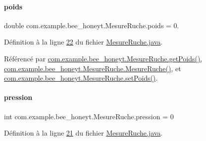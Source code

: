 \mbox{\label{classcom_1_1example_1_1bee__honeyt_1_1_mesure_ruche_a9aa6c575b7b69c4fb3825944e1f50722}} 
\paragraph{\texorpdfstring{poids}{poids}}
{\footnotesize\ttfamily double com.\+example.\+bee\+\_\+honeyt.\+Mesure\+Ruche.\+poids = 0.\hspace{0.3cm}{\ttfamily [private]}}



Définition à la ligne \hyperlink{_mesure_ruche_8java_source_l00022}{22} du fichier \hyperlink{_mesure_ruche_8java_source}{Mesure\+Ruche.\+java}.



Référencé par \hyperlink{_mesure_ruche_8java_source_l00102}{com.\+example.\+bee\+\_\+honeyt.\+Mesure\+Ruche.\+get\+Poids()}, \hyperlink{_mesure_ruche_8java_source_l00030}{com.\+example.\+bee\+\_\+honeyt.\+Mesure\+Ruche.\+Mesure\+Ruche()}, et \hyperlink{_mesure_ruche_8java_source_l00107}{com.\+example.\+bee\+\_\+honeyt.\+Mesure\+Ruche.\+set\+Poids()}.

\mbox{\label{classcom_1_1example_1_1bee__honeyt_1_1_mesure_ruche_ae78080a6d5745faa411e3cfbdbf8aeec}} 
\paragraph{\texorpdfstring{pression}{pression}}
{\footnotesize\ttfamily int com.\+example.\+bee\+\_\+honeyt.\+Mesure\+Ruche.\+pression = 0\hspace{0.3cm}{\ttfamily [private]}}



Définition à la ligne \hyperlink{_mesure_ruche_8java_source_l00021}{21} du fichier \hyperlink{_mesure_ruche_8java_source}{Mesure\+Ruche.\+java}.



